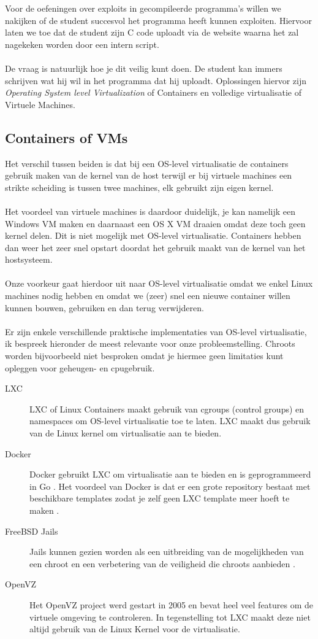 Voor de oefeningen over exploits in gecompileerde programma's willen we nakijken of de student succesvol het programma heeft kunnen exploiten. Hiervoor laten we toe dat de student zijn C code uploadt via de website waarna het zal nagekeken worden door een intern script.\\
\\
De vraag is natuurlijk hoe je dit veilig kunt doen. De student kan immers schrijven wat hij wil in het programma dat hij uploadt. Oplossingen hiervor zijn \emph{Operating System level Virtualization} of Containers en volledige virtualisatie of Virtuele Machines.

\subsection{Containers of VMs}
Het verschil tussen beiden is dat bij een OS-level virtualisatie de containers gebruik maken van de kernel van de host terwijl er bij virtuele machines een strikte scheiding is tussen twee machines, elk gebruikt zijn eigen kernel.\\
\\
Het voordeel van virtuele machines is daardoor duidelijk, je kan namelijk een Windows VM maken en daarnaast een OS X VM draaien omdat deze toch geen kernel delen. Dit is niet mogelijk met OS-level virtualisatie. Containers hebben dan weer het zeer snel opstart doordat het gebruik maakt van de kernel van het hostsysteem.\\
\\
Onze voorkeur gaat hierdoor uit naar OS-level virtualisatie omdat we enkel Linux machines nodig hebben en omdat we (zeer) snel een nieuwe container willen kunnen bouwen, gebruiken en dan terug verwijderen.\\
\\
Er zijn enkele verschillende praktische implementaties van OS-level virtualisatie, ik bespreek hieronder de meest relevante voor onze probleemstelling. Chroots worden bijvoorbeeld niet besproken omdat je hiermee geen limitaties kunt opleggen voor geheugen- en cpugebruik.
\begin{description}
\item[LXC] LXC of Linux Containers maakt gebruik van cgroups (control groups) en namespaces om OS-level virtualisatie toe te laten. LXC maakt dus gebruik van de Linux kernel om virtualisatie aan te bieden.
\item[Docker] Docker gebruikt LXC om virtualisatie aan te bieden en is geprogrammeerd in Go \cite{dockergithub}. Het voordeel van Docker is dat er een grote repository bestaat met beschikbare templates zodat je zelf geen LXC template meer hoeft te maken \cite{dockerrepo}.
\item[FreeBSD Jails] Jails kunnen gezien worden als een uitbreiding van de mogelijkheden van een chroot en een verbetering van de veiligheid die chroots aanbieden \cite{freebsd}.
\item[OpenVZ] Het OpenVZ project werd gestart in 2005 en bevat heel veel features om de virtuele omgeving te controleren. In tegenstelling tot LXC maakt deze niet altijd gebruik van de Linux Kernel voor de virtualisatie.
\end{description}

